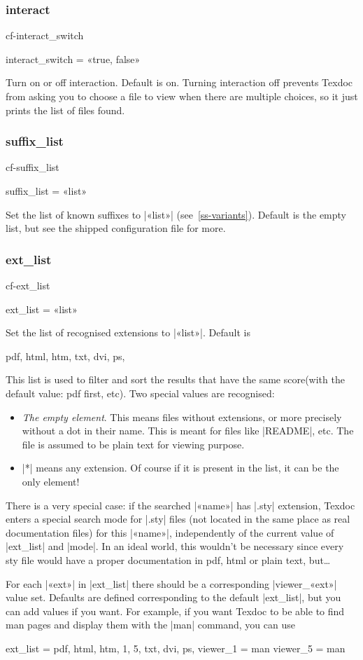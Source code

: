 \documentclass[a4paper, oneside]{scrartcl}
\makeatletter
\newif\ifframed
\newenvironment{cmdsubsub}[2]{%
  \framedfalse \commandes\subsubsection{#1}{#2}%
  }{%
  \endcommandes}
\newenvironment{htcode}{%
  \SaveVerbatim[samepage, gobble=2]{verbmat}%
  }{%
  \endSaveVerbatim
  \par\medskip\noindent\hspace*{\parindent}%
  \BUseVerbatim{verbmat}%
  \par\medskip\@endpetrue}
\makeatother
\begin{document}
\begin{cmdsubsub}{interact}{cf-interact_switch}
  interact_switch = «true, false»
\end{cmdsubsub}

Turn on or off interaction.  Default is on.  Turning interaction off prevents
Texdoc from asking you to choose a file to view when there are multiple
choices, so it just prints the list of files found.

\begin{cmdsubsub}{suffix_list}{cf-suffix_list}
  suffix_list = «list»
\end{cmdsubsub}

Set the list of known suffixes to |«list»| (see~\ref{ss-variants}). Default is
the empty list, but see the shipped configuration file for more.

\begin{cmdsubsub}{ext_list}{cf-ext_list}
  ext_list = «list»
\end{cmdsubsub}

Set the list of recognised extensions to |«list»|.  Default is
\begin{htcode}
  pdf, html, htm, txt, dvi, ps,
\end{htcode}
This list is used to filter and  sort the results that have the same
score(with the default value: pdf first, etc).  Two special values are
recognised:
\begin{itemize}
  \item \emph{The empty element}. This means files without extensions, or more
    precisely without a dot in their name.  This is meant for files like
    |README|, etc.  The file is assumed to be plain text for viewing purpose.
  \item |*| means any extension.  Of course if it is present in the list, it
    can be the only element!
\end{itemize}

There is a very special case: if the searched |«name»| has |.sty| extension,
Texdoc enters a special search mode for |.sty| files (not located in the same
place as real documentation files) for this |«name»|, independently of the
current value of |ext_list| and |mode|. In an ideal world, this wouldn't be
necessary since every sty file would have a proper documentation in pdf, html
or plain text, but\dots

For each |«ext»| in |ext_list| there should be a corresponding |viewer_«ext»|
value set.  Defaults are defined corresponding to the default |ext_list|, but
you can add values if you want.  For example, if you want Texdoc to be able
to find man pages and display them with the |man| command, you can use
\begin{htcode}
  ext_list = pdf, html, htm, 1, 5, txt, dvi, ps,
  viewer_1 = man
  viewer_5 = man
\end{htcode}
\end{document}
